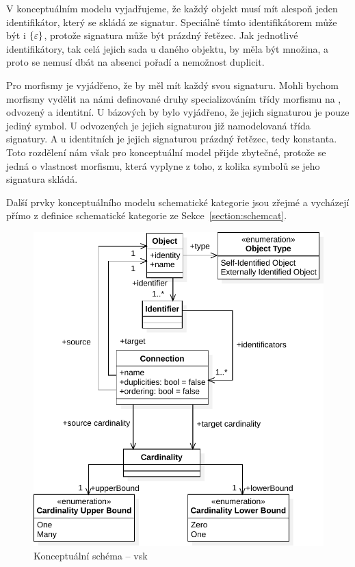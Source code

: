 V konceptuálním modelu vyjadřujeme, že každý objekt musí mít alespoň jeden identifikátor, který se skládá ze signatur.
Speciálně tímto identifikátorem může být i $\left\{\varepsilon\right\}$, protože signatura může být prázdný řetězec.
Jak jednotlivé identifikátory, tak celá jejich sada u daného objektu, by měla být množina, a proto se nemusí dbát na absenci pořadí a nemožnost duplicit.

Pro morfismy je vyjádřeno, že by měl mít každý svou signaturu.
Mohli bychom morfismy vydělit na námi definované druhy specializováním třídy morfismu na , odvozený a identitní.
U bázových by bylo vyjádřeno, že jejich signaturou je pouze jediný symbol.
U odvozených je jejich signaturou již namodelovaná třída signatury.
A u identitních je jejich signaturou prázdný řetězec, tedy konstanta.
Toto rozdělení nám však pro konceptuální model přijde zbytečné, protože se jedná o vlastnost morfismu, která vyplyne z toho, z kolika symbolů se jeho signatura skládá.

Další prvky konceptuálního modelu schematické kategorie jsou zřejmé a vycházejí přímo z definice schematické kategorie ze Sekce~\ref{section:schemcat}.

\begin{figure}[!htb]
  \centering
  \includegraphics[width=\maxwidth{\textwidth}]{../img/diagrams/scv-model.pdf}
  \caption{Konceptuální schéma -- \acrlong{vsk}}
  \label{fig:class-diagram:scv}
\end{figure}

